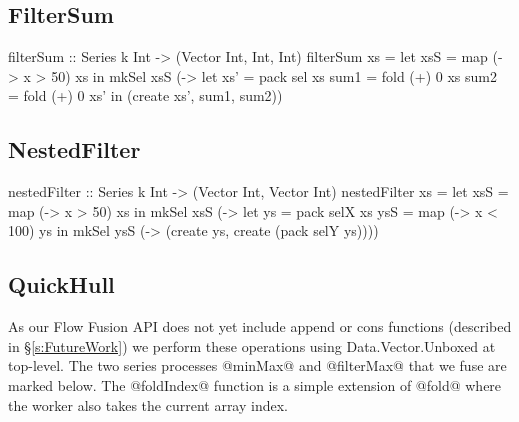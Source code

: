 \subsection{FilterSum}
\begin{small}
\begin{code}
filterSum :: Series k Int 
          -> (Vector Int, Int, Int)
filterSum xs
 = let xsS = map (\x -> x > 50) xs
   in  mkSel xsS (\sel ->
       let xs'  = pack sel xs
           sum1 = fold (+) 0 xs
           sum2 = fold (+) 0 xs'
       in  (create xs', sum1, sum2))
\end{code}
\end{small}


\subsection{NestedFilter}
\begin{small}
\begin{code}
nestedFilter :: Series k Int 
             -> (Vector Int, Vector Int)
nestedFilter xs
 = let xsS = map (\x -> x > 50) xs
   in  mkSel xsS (\selX ->
       let ys  = pack selX xs
           ysS = map (\x -> x < 100) ys
       in  mkSel ysS (\selY ->
            (create ys, create (pack selY ys))))
\end{code}
\end{small}


\eject
\subsection{QuickHull}
As our Flow Fusion API does not yet include append or cons functions (described in \S\ref{s:FutureWork}) we perform these operations using Data.Vector.Unboxed at top-level. The two series processes @minMax@ and @filterMax@ that we fuse are marked below. The @foldIndex@ function is a simple extension of @fold@ where the worker also takes the current array index.

